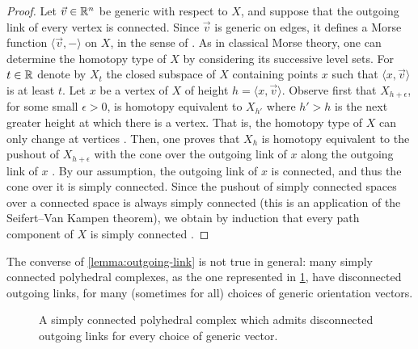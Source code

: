 \begin{proof}
    Let $\vec v \in \mathbb R^n$ be generic with respect to $X$, and suppose that the outgoing link of every vertex is connected. 
    Since $\vec v$ is generic on edges, it defines a Morse function $\langle \vec v , -\rangle$ on $X$, in the sense of \cite[Def.~2.2]{bestvinaMorseTheoryFiniteness1997}.
    As in classical Morse theory, one can determine the homotopy type of $X$ by considering its successive level sets. 
    For $t \in \mathbb R$ denote by $X_t$ the closed subspace of $X$ containing points $x$ such that $\langle x, \vec v \rangle$ is at least $t$.
    Let $x$ be a vertex of $X$ of height $h=\langle x, \vec v \rangle$.
    Observe first that $X_{h+\epsilon}$, for some small $\epsilon>0$, is homotopy equivalent to $X_{h'}$ where $h' > h$ is the next greater height at which there is a vertex.
    That is, the homotopy type of $X$ can only change at vertices  \cite[Lem.~2.3]{bestvinaMorseTheoryFiniteness1997}.
    Then, one proves that $X_h$ is homotopy equivalent to the pushout of $X_{h+\epsilon}$ with the cone over the outgoing link of $x$ along the outgoing link of $x$  \cite[Lem.~2.5]{bestvinaMorseTheoryFiniteness1997}.
    By our assumption, the outgoing link of $x$ is connected, and thus the cone over it is simply connected. 
    Since the pushout of simply connected spaces over a connected space is always simply connected (this is an application of the Seifert--Van Kampen theorem), we obtain by induction that every path component of $X$ is simply connected \cite[Point (3) of Cor.~2.6]{bestvinaMorseTheoryFiniteness1997}.
\end{proof}

The converse of \cref{lemma:outgoing-link} is not true in general: many simply connected polyhedral complexes, as the one represented in \cref{fig:outgoingpoly}, have disconnected outgoing links, for many (sometimes for all) choices of generic orientation vectors. 

\begin{figure}[h!]
\centering
{}
\caption{A simply connected polyhedral complex which admits disconnected outgoing links for every choice of generic vector.}
\label{fig:outgoingpoly}
\end{figure}


